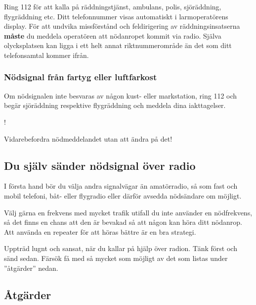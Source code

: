 Ring 112 för att kalla på räddningstjänst, ambulans, polis, sjöräddning,
flygräddning etc.               %
Ditt telefonnummer visas automatiskt i larmoperatörens display.
För att undvika missförstånd och feldirigering av räddningsinsatserna
\textbf{måste} du meddela operatören att nödanropet kommit via radio.
Själva olycksplatsen kan ligga i ett helt annat riktnummerområde än det som ditt
telefonsamtal kommer ifrån.

\subsubsection{Nödsignal från fartyg eller luftfarkost}
\label{nödsignal fartyg}

Om nödsignalen inte besvaras av någon kust- eller markstation, ring 112
och begär sjöräddning respektive flygräddning och meddela dina iakttagelser.

\begin{center}
\begin{minipage}{0.19\columnwidth}
\Huge{\Huge{\hspace{1ex}!}}
\end{minipage}
\begin{minipage}{0.7\columnwidth}
Vidarebefordra nödmeddelandet utan att ändra på det!
\end{minipage}
\end{center}

\subsection{Du själv sänder nödsignal över radio}
\label{nödtrafik egen}

I första hand bör du välja andra signalvägar än amatörradio, så som fast och
mobil telefoni, båt- eller flygradio eller därför avsedda nödsändare om möjligt.

Välj gärna en frekvens med mycket trafik utifall du inte använder en
nödfrekvens, så det finns en chans att den är bevakad så att någon kan höra
ditt nödanrop.
Att använda en repeater för att höras bättre är en bra strategi.

Uppträd lugnt och sansat, när du kallar på hjälp över radion.
Tänk först och sänd sedan. Färsök få med så mycket som möjligt av det som listas
under ''åtgärder'' nedan.

\newpage %
\subsection{Åtgärder}

